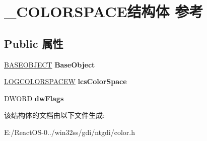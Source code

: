 \hypertarget{struct___c_o_l_o_r_s_p_a_c_e}{}\section{\+\_\+\+C\+O\+L\+O\+R\+S\+P\+A\+C\+E结构体 参考}
\label{struct___c_o_l_o_r_s_p_a_c_e}
\subsection*{Public 属性}
\begin{DoxyCompactItemize}
\item 
\mbox{\label{struct___c_o_l_o_r_s_p_a_c_e_ac71c8602d7ead81c6ac6cc87d32483ad}} 
\hyperlink{class_b_a_s_e_o_b_j_e_c_t}{B\+A\+S\+E\+O\+B\+J\+E\+CT} {\bfseries Base\+Object}
\item 
\mbox{\label{struct___c_o_l_o_r_s_p_a_c_e_a6e2af1d1cbb69494835e18ea73e40de9}} 
\hyperlink{structtag_l_o_g_c_o_l_o_r_s_p_a_c_e_w}{L\+O\+G\+C\+O\+L\+O\+R\+S\+P\+A\+C\+EW} {\bfseries lcs\+Color\+Space}
\item 
\mbox{\label{struct___c_o_l_o_r_s_p_a_c_e_a002fdccffaf9f23d66a2d4d38dd9ff0f}} 
D\+W\+O\+RD {\bfseries dw\+Flags}
\end{DoxyCompactItemize}


该结构体的文档由以下文件生成\+:\begin{DoxyCompactItemize}
\item 
E\+:/\+React\+O\+S-\/0../win32ss/gdi/ntgdi/color.\+h\end{DoxyCompactItemize}
